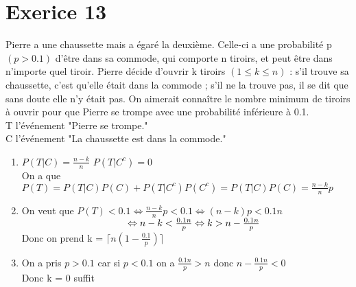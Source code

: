 \documentclass{article}
\author{Frederic Becerril}
\newcommand\tab[1][1cm]{\hspace*{#1}}
\begin{document}
\part*{Exerice 13}

Pierre a une chaussette mais a égaré la deuxième. Celle-ci a une probabilité p $(p > 0.1)$ d'être
dans sa commode, qui comporte n tiroirs, et peut être dans n'importe quel tiroir. Pierre décide
d'ouvrir k tiroirs $(1 \leq k \leq n)$ : s'il trouve sa chaussette, c'est qu'elle était dans la commode ;
s'il ne la trouve pas, il se dit que sans doute elle n'y était pas. On aimerait connaître le nombre
minimum de tiroirs à ouvrir pour que Pierre se trompe avec une probabilité inférieure à 0.1.\\
T l'événement "Pierre se trompe."\\
C l'événement "La chaussette est dans la commode."
\begin{enumerate}
    \item $P(T|C) = \frac{n - k}{n}$ \tab $P(T|C^c) = 0$\\
        On a que $P(T) = P(T|C)P(C) + P(T|C^c)P(C^c) = P(T|C)P(C) = \frac{n - k}{n}p$
    \item On veut que $P(T) < 0.1 \Leftrightarrow \frac{n - k}{n}p < 0.1 \Leftrightarrow (n - k)p < 0.1n$\\
        $\tab[3.85cm] \Leftrightarrow n - k < \frac{0.1n}{p} \Leftrightarrow k > n - \frac{0.1n}{p}$\\
        Donc on prend k = $\lceil n(1 - \frac{0.1}{p}) \rceil$
    \item On a pris $p > 0.1$ car si $p < 0.1$ on a $\frac{0.1n}{p} > n$ donc $n - \frac{0.1n}{p} < 0$\\
    Donc k = 0 suffit
\end{enumerate}
\end{document}
